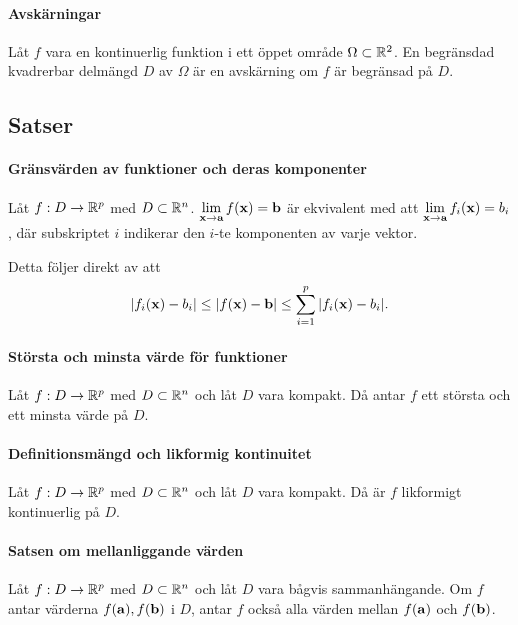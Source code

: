 \paragraph{Avskärningar}
Låt $f$ vara en kontinuerlig funktion i ett öppet område $\Omega\subset\mathbb{R}^2$. En begränsdad kvadrerbar delmängd $D$ av $\Omega$ är en avskärning om $f$ är begränsad på $D$.

\subsection{Satser}

\paragraph{Gränsvärden av funktioner och deras komponenter}
Låt $f: D\to\mathbb{R}^p$ med $D\subset\mathbb{R}^n$. $\limit{\vect{x}}{\vect{a}}f(\vect{x}) = \vect{b}$ är ekvivalent med att $\limit{\vect{x}}{\vect{a}}f_i(\vect{x}) = b_i$, där subskriptet $i$ indikerar den $i$-te komponenten av varje vektor.

\proof
Detta följer direkt av att
\begin{align*}
	\abs{f_i(\vect{x}) - b_i}\leq\abs{f(\vect{x}) - \vect{b}}\leq\sum\limits_{i = 1}^{p}\abs{f_i(\vect{x}) - b_i}.
\end{align*}

\paragraph{Största och minsta värde för funktioner}
Låt $f: D\to\mathbb{R}^p$ med $D\subset\mathbb{R}^n$ och låt $D$ vara kompakt. Då antar $f$ ett största och ett minsta värde på $D$.

\proof

\paragraph{Definitionsmängd och likformig kontinuitet}
Låt $f: D\to\mathbb{R}^p$ med $D\subset\mathbb{R}^n$ och låt $D$ vara kompakt. Då är $f$ likformigt kontinuerlig på $D$.

\proof

\paragraph{Satsen om mellanliggande värden}
Låt $f: D\to\mathbb{R}^p$ med $D\subset\mathbb{R}^n$ och låt $D$ vara bågvis sammanhängande. Om $f$ antar värderna $f(\vect{a}), f(\vect{b})$ i $D$, antar $f$ också alla värden mellan $f(\vect{a})$ och $f(\vect{b})$.


